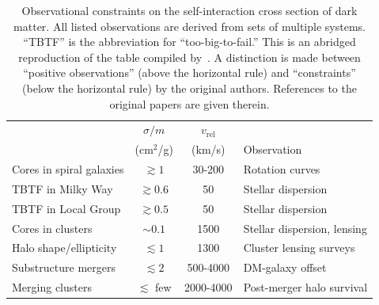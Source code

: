 \begin{table}
    \centering
    \begin{tabular}{lccl}\toprule
        & $\sigma / m$ & $v_{\text{rel}}$ &
        \\
        & (cm$^2$/g) & (km/s) & Observation
        \\ \midrule
        Cores in spiral galaxies
        & $\gtrsim 1$ & 30-200 & Rotation curves
        \\
        TBTF in Milky Way
        & $\gtrsim 0.6$ & 50 & Stellar dispersion
        \\
        TBTF in Local Group 
        & $\gtrsim 0.5$ & 50 & Stellar dispersion
        \\
        Cores in clusters 
        & $\sim 0.1$ & 1500 & Stellar dispersion, lensing
        \\ \midrule
        Halo shape/ellipticity
        & $\lesssim 1$ & 1300 & Cluster lensing surveys
        \\
        Substructure mergers
        & $\lesssim 2$ & 500-4000 & DM-galaxy offset
        \\
        Merging clusters
        & $\lesssim$ few & 2000-4000 & Post-merger halo survival
        \\ \bottomrule
    \end{tabular}
    \caption{%
        Observational constraints on the self-interaction cross section of
        dark matter. All listed observations are derived from sets of multiple
        systems. ``TBTF'' is the abbreviation for ``too-big-to-fail.'' This is
        an abridged reproduction of the table compiled
        by~\cite{tulin_dark_2018}. A distinction is made between ``positive
        observations'' (above the horizontal rule) and ``constraints'' (below
        the horizontal rule) by the original authors. References to the
        original papers are given therein.
    }
    \label{tab:constraints}
\end{table}


